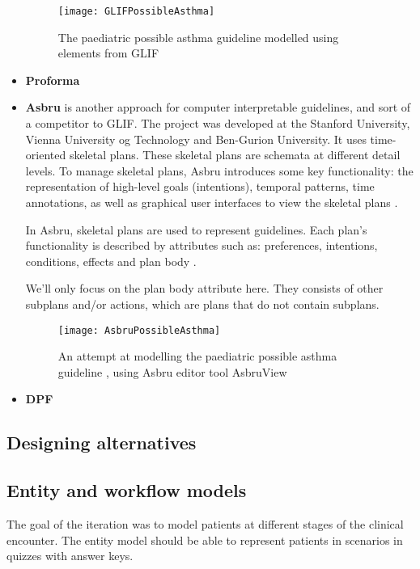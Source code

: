 \begin{itemize}
	
	\begin{figure}[h!]
		\caption {The paediatric possible asthma guideline \cite{RepublicofKeny2016} modelled using elements from GLIF}
		\label{fig:GLIFPossibleAsthma}
		\texttt{[image: GLIFPossibleAsthma]}
	\end{figure}
	\item \textbf{Proforma}
	\item \textbf{Asbru} is another approach for computer interpretable guidelines, and sort of a competitor to GLIF. The project was developed at the Stanford University, Vienna University og Technology and Ben-Gurion University. It uses time-oriented skeletal plans. These skeletal plans are schemata at different detail levels. To manage skeletal plans, Asbru introduces some key functionality: the representation of high-level goals (intentions), temporal patterns, time annotations, as well as graphical user interfaces to view the skeletal plans \parencite{DeClercq2008}.
	
	In Asbru, skeletal plans are used to represent guidelines. Each plan's functionality is described by attributes such as: preferences, intentions, conditions, effects and plan body \parencite{DeClercq2008}.
	
	We'll only focus on the plan body attribute here. They consists of other subplans and/or actions, which are plans that do not contain subplans.  
	
	
		\begin{figure}[h!]
		\caption {An attempt at modelling the paediatric possible asthma guideline \cite{RepublicofKeny2016}, using Asbru editor tool AsbruView \parencite{TheAasgardProject2006}}
		\label{fig:AsbruPossibleAsthma}
		\texttt{[image: AsbruPossibleAsthma]}
	\end{figure}
	\item \textbf{DPF}
\end{itemize}



\subsection{Designing alternatives}

\subsection {Entity and workflow models}
The goal of the iteration was to model patients at different stages of the clinical encounter. The entity model should be able to represent patients in scenarios in quizzes with answer keys.

